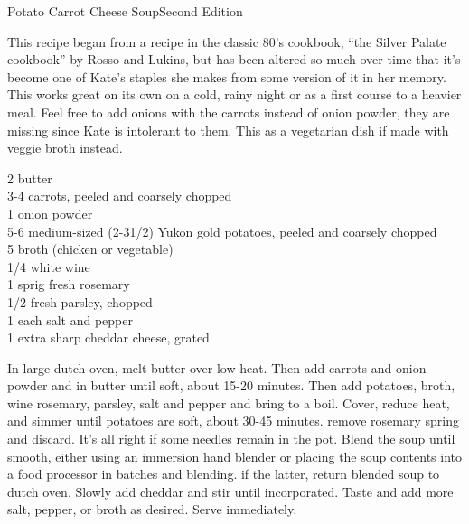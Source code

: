 \begin{entry}{Potato Carrot Cheese Soup}{Second Edition}

\begin{open}
  This recipe began from a recipe in the classic 80's cookbook, ``the Silver
  Palate cookbook'' by Rosso and Lukins, but has been altered so much over
  time that it's become one of Kate's staples she makes from some version of
  it in her memory. This works great on its own on a cold, rainy night or as a
  first course to a heavier meal. Feel free to add onions with the carrots
  instead of onion powder, they are missing since Kate is intolerant to them. This as a vegetarian dish if made with veggie broth instead.
\end{open}
\begin{ingredients}
    \SI{2}{\tblspoon} butter\\
    3-4 carrots, peeled and coarsely chopped\\
    \SI{1}{\teaspoon} onion powder\\
    5-6 medium-sized (2-3\SI{1/2}{\pound}) Yukon gold potatoes, peeled and
    coarsely chopped \\
    \SI{5}{\cup} broth (chicken or vegetable)\\
    \SI{1/4}{\cup} white wine \\
    1 sprig fresh rosemary \\
    \SI{1/2}{\cup} fresh parsley, chopped\\
    \SI{1}{\teaspoon} each salt and pepper\\
    \SI{1}{\cup} extra sharp cheddar cheese, grated
\end{ingredients}
In large dutch oven, melt butter over low heat. Then add carrots and onion
powder and \saute in butter until soft, about 15-20 minutes. Then add potatoes,
broth, wine rosemary, parsley, salt and pepper and bring to a boil. Cover,
reduce heat, and simmer until potatoes are soft, about 30-45 minutes. remove
rosemary spring and discard. It's all right if some needles remain in the
pot. Blend the soup until smooth, either using an immersion hand blender or
placing the soup contents into a food processor in batches and blending. if
the latter, return blended soup to dutch oven. Slowly add cheddar and stir
until incorporated. Taste and add more salt, pepper, or broth as
desired. Serve immediately.
\end{entry}

